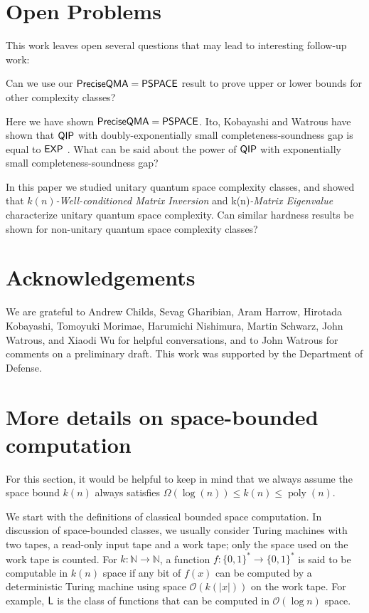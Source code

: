 \documentclass[11pt]{article}
\theoremstyle{definition}
\theoremstyle{remark}
\newcommand\EXP{{\sf{EXP}}}
\newcommand\QIP{{\sf{QIP}}}
\newcommand\PSPACE{{\sf{PSPACE}}}
\newcommand\Logspace{{\sf{L}}}
\newcommand\QMAexp{{\sf{PreciseQMA}}}
\newcommand\matrixinvert[1]{{\ensuremath{#1}}\textit{-Well-conditioned Matrix Inversion}}
\newcommand\spechamiltonian[1]{#1\textit{-Matrix Eigenvalue}}
\newcommand\bigoh{\mathcal{O}}
\DeclareMathOperator{\poly}{poly}
\begin{document}
\section{Open Problems}
This work leaves open several questions that may lead to interesting follow-up work:
\begin{compactenum}
\begin{item} Can we use our $\QMAexp=\PSPACE$ result to prove upper or lower bounds for other complexity classes? \end{item}
\begin{item} Here we have shown $\QMAexp=\PSPACE$.  Ito, Kobayashi and Watrous  have shown that $\QIP$ with doubly-exponentially small completeness-soundness gap is equal to $\EXP$ \cite{ikw12}.  What can be said about the power of $\QIP$ with exponentially small completeness-soundness gap?\end{item}
\begin{item}In this paper we studied unitary quantum space complexity classes, and showed that \matrixinvert{k(n)} and \spechamiltonian{k(n)} characterize unitary quantum space complexity.  Can similar hardness results be shown for non-unitary quantum space complexity classes?\end{item}
\end{compactenum}


\section{Acknowledgements}
We are grateful to Andrew Childs, Sevag Gharibian, Aram Harrow, Hirotada Kobayashi, Tomoyuki Morimae, Harumichi Nishimura, Martin Schwarz, John Watrous, and Xiaodi Wu for helpful conversations, and to John Watrous for comments on a preliminary draft. This work was supported by the Department of Defense.

\appendix

\section{More details on space-bounded computation}\label{app: space bounded}
For this section, it would be helpful to keep in mind that we always assume the space bound $k(n)$ always satisfies $\Omega(\log(n)) \le k(n) \le \poly(n)$.

We start with the definitions of classical bounded space computation. In discussion of space-bounded classes, we usually consider Turing machines with two tapes, a read-only input tape and a work tape; only the space used on the work tape is counted. For $k:\mathbb{N}\rightarrow\mathbb{N}$, a function $f:\{0,1\}^{*}\rightarrow\{0,1\}^*$ is said to be computable in $k(n)$ space if any bit of $f(x)$ can be computed by a deterministic Turing machine using space $\bigoh(k(|x|))$ on the work tape.  For example, $\Logspace$ is the class of functions that can be computed in $\bigoh(\log{n})$ space.
\end{document}
